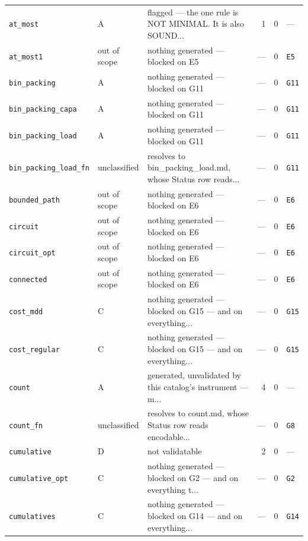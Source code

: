 \documentclass[10pt,a4paper]{article}
\begin{document}
\begin{longtable}{@{}>{\raggedright\arraybackslash}p{}l>{\raggedright\arraybackslash}p{}rrl@{}}
\texttt{at\_\allowbreak{}most} & A & flagged --- the one rule is NOT MINIMAL. It is also SOUND... & 1 & 0 & --- \\
\texttt{at\_\allowbreak{}most1} & out of scope & nothing generated --- blocked on E5 & --- & 0 & \texttt{E5} \\
\texttt{bin\_\allowbreak{}packing} & A & nothing generated --- blocked on G11 & --- & 0 & \texttt{G11} \\
\texttt{bin\_\allowbreak{}packing\_\allowbreak{}capa} & A & nothing generated --- blocked on G11 & --- & 0 & \texttt{G11} \\
\texttt{bin\_\allowbreak{}packing\_\allowbreak{}load} & A & nothing generated --- blocked on G11 & --- & 0 & \texttt{G11} \\
\texttt{bin\_\allowbreak{}packing\_\allowbreak{}load\_\allowbreak{}fn} & unclassified & resolves to bin\_packing\_load.md, whose Status row reads... & --- & 0 & \texttt{G11} \\
\texttt{bounded\_\allowbreak{}path} & out of scope & nothing generated --- blocked on E6 & --- & 0 & \texttt{E6} \\
\texttt{circuit} & out of scope & nothing generated --- blocked on E6 & --- & 0 & \texttt{E6} \\
\texttt{circuit\_\allowbreak{}opt} & out of scope & nothing generated --- blocked on E6 & --- & 0 & \texttt{E6} \\
\texttt{connected} & out of scope & nothing generated --- blocked on E6 & --- & 0 & \texttt{E6} \\
\texttt{cost\_\allowbreak{}mdd} & C & nothing generated --- blocked on G15 --- and on everything... & --- & 0 & \texttt{G15} \\
\texttt{cost\_\allowbreak{}regular} & C & nothing generated --- blocked on G15 --- and on everything... & --- & 0 & \texttt{G15} \\
\texttt{count} & A & generated, unvalidated by this catalog's instrument --- m... & 4 & 0 & --- \\
\texttt{count\_\allowbreak{}fn} & unclassified & resolves to count.md, whose Status row reads encodable... & --- & 0 & \texttt{G8} \\
\texttt{cumulative} & D & not validatable & 2 & 0 & --- \\
\texttt{cumulative\_\allowbreak{}opt} & C & nothing generated --- blocked on G2 --- and on everything t... & --- & 0 & \texttt{G2} \\
\texttt{cumulatives} & C & nothing generated --- blocked on G14 --- and on everything... & --- & 0 & \texttt{G14} \\

\end{longtable}
\end{document}
